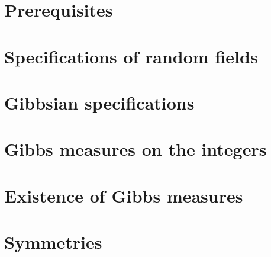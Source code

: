 
\chapter{Prerequisites}



\chapter{Specifications of random fields}





\chapter{Gibbsian specifications}






\chapter{Gibbs measures on the integers}



\chapter{Existence of Gibbs measures}





\chapter{Symmetries}




